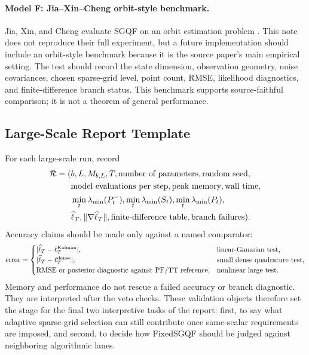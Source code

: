 \documentclass[11pt]{article}
\numberwithin{equation}{section}
\newcommand{\ellhat}{\widehat\ell}
\begin{document}
\paragraph{Model F: Jia--Xin--Cheng orbit-style benchmark.}
Jia, Xin, and Cheng evaluate SGQF on an orbit estimation problem
\cite[Section 4]{jia2012sparsegrid}.  This note does not reproduce their full
experiment, but a future implementation should include an orbit-style
benchmark because it is the source paper's main empirical setting.  The test
should record the state dimension, observation geometry, noise covariances,
chosen sparse-grid level, point count, RMSE, likelihood diagnostics, and
finite-difference branch status.  This benchmark supports source-faithful
comparison; it is not a theorem of general performance.

\subsection{Large-Scale Report Template}
\label{subsec:p32-large-scale-report}

For each large-scale run, record
\begin{equation}
\begin{aligned}
  \mathcal R
  =
  (&b,L,M_{b,L},T,\hbox{number of parameters},\hbox{random seed},\\
  &\hbox{model evaluations per step},\hbox{peak memory},\hbox{wall time},\\
  &\min_t\lambda_{\min}(P_t^-),
  \min_t\lambda_{\min}(S_t),
  \min_t\lambda_{\min}(P_t),\\
  &\ellhat_T,\|\nabla\ellhat_T\|,
  \hbox{finite-difference table},\hbox{branch failures}).
\end{aligned}
  \label{eq:p32-large-scale-report}
\end{equation}
Accuracy claims should be made only against a named comparator:
\begin{equation}
  \hbox{error}
  =
  \begin{cases}
  |\ellhat_T-\ell_T^{\rm Kalman}|, & \hbox{linear-Gaussian test},\\
  |\ellhat_T-\ell_T^{\rm dense}|, & \hbox{small dense quadrature test},\\
  \hbox{RMSE or posterior diagnostic against PF/TT reference}, &
  \hbox{nonlinear large test}.
  \end{cases}
  \label{eq:p32-comparator-errors}
\end{equation}
Memory and performance do not rescue a failed accuracy or branch diagnostic.
They are interpreted after the veto checks.  These validation objects therefore
set the stage for the final two interpretive tasks of the report: first, to say
what adaptive sparse-grid selection can still contribute once same-scalar
requirements are imposed, and second, to decide how FixedSGQF should be judged
against neighboring algorithmic lanes.
\end{document}
